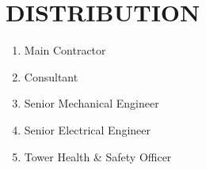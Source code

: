 \section{DISTRIBUTION}
\begin{enumerate}

\item	Main Contractor
\item	Consultant
\item	Senior Mechanical Engineer
\item	Senior Electrical Engineer
\item	Tower Health \& Safety Officer



\end{enumerate}